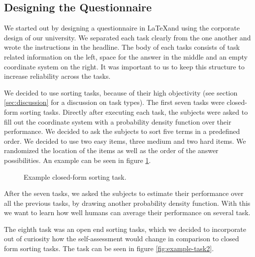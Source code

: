 \documentclass[../main/main.tex]{subfiles}
\begin{document}
	
	
	\subsection{Designing the Questionnaire}
	
	We started out by designing a questionnaire in \LaTeX and using the corporate design of our university. We separated each task clearly from the one another and wrote the instructions in the headline. The body of each tasks consists of task related information on the left, space for the answer in the middle and an empty coordinate system on the right. It was important to us to keep this structure to increase reliability across the tasks.
	
	We decided to use sorting tasks, because of their high objectivity (see section \ref{sec:discussion} for a discussion on task types). The first seven tasks were closed-form sorting tasks. Directly after executing each task, the subjects were asked to fill out the coordinate system with a probability density function over their performance. We decided to ask the subjects to sort five terms in a predefined order. We decided to use two easy items, three medium and two hard items. We randomized the location of the items as well as the order of the answer possibilities. An example can be seen in figure \ref{fig:example-task}.
	
	\begin{figure}[h]
		\centering
		\captionsetup{justification=centering}
		\caption{Example closed-form sorting task.}
		\label{fig:example-task}
	\end{figure} 
	
	After the seven tasks, we asked the subjects to estimate their performance over all the previous tasks, by drawing another probability density function. With this we want to learn how well humans can average their performance on several task. 
		
	 The eighth task was an open end sorting tasks, which we decided to incorporate out of curiosity how the self-assessment would change in comparison to closed form sorting tasks. The task can be seen in figure \ref{fig:example-task2}.
	 
\end{document}
